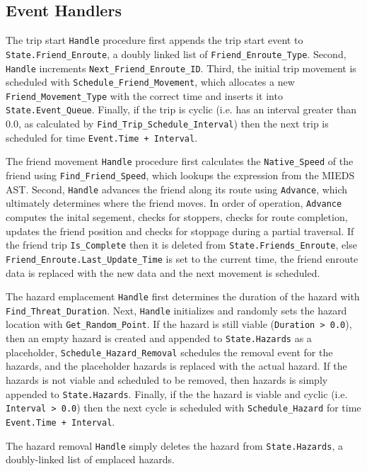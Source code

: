 \documentclass[12pt,letterpaper,titlepage]{article}
\newcommand{\code}[1]{\texttt{#1}}
\newcommand{\mieds}[0]{\textsc{MIEDS}}
\begin{document}
\subsection{Event Handlers}
The trip start \code{Handle} procedure first appends the trip start
event to \code{State.Friend_Enroute}, a doubly linked list of
\code{Friend_Enroute_Type}.  Second, \code{Handle} increments
\code{Next_Friend_Enroute_ID}.  Third, the initial trip movement is
scheduled with \code{Schedule_Friend_Movement}, which allocates a new
\code{Friend_Movement_Type} with the correct time and inserts it into
\code{State.Event_Queue}.  Finally, if the trip is cyclic (i.e. has an
interval greater than 0.0, as calculated by
\code{Find_Trip_Schedule_Interval}) then the next trip is scheduled
for time \code{Event.Time + Interval}.

The friend movement \code{Handle} procedure first calculates the
\code{Native_Speed} of the friend using \code{Find_Friend_Speed},
which lookups the expression from the \mieds{} AST.  Second,
\code{Handle} advances the friend along its route using
\code{Advance}, which ultimately determines where the friend moves.
In order of operation, \code{Advance} computes the inital segement,
checks for stoppers, checks for route completion, updates the friend
position and checks for stoppage during a partial traversal.  If the
friend trip \code{Is_Complete} then it is deleted from
\code{State.Friends_Enroute}, else
\code{Friend_Enroute.Last_Update_Time} is set to the current time, the
friend enroute data is replaced with the new data and the next
movement is scheduled.

The hazard emplacement \code{Handle} first determines the duration of
the hazard with \code{Find_Threat_Duration}.  Next, \code{Handle}
initializes and randomly sets the hazard location with
\code{Get_Random_Point}.  If the hazard is still viable
(\code{Duration > 0.0}), then an empty hazard is created and appended
to \code{State.Hazards} as a placeholder,
\code{Schedule_Hazard_Removal} schedules the removal event for the
hazards, and the placeholder hazards is replaced with the actual
hazard.  If the hazards is not viable and scheduled to be removed,
then hazards is simply appended to \code{State.Hazards}.  Finally, if
the the hazard is viable and cyclic (i.e. \code{Interval > 0.0}) then
the next cycle is scheduled with \code{Schedule_Hazard} for time
\code{Event.Time + Interval}.

The hazard removal \code{Handle} simply deletes the hazard from
\code{State.Hazards}, a doubly-linked list of emplaced hazards.
\end{document}
